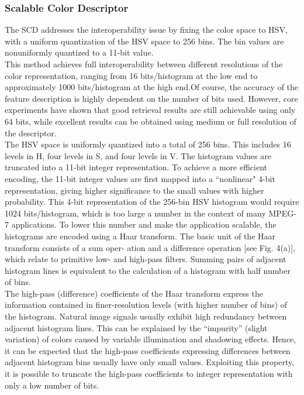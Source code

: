 \subsubsection{Scalable Color Descriptor}
%
The SCD addresses the interoperability issue by fixing the color space to HSV, with a uniform quantization of the HSV space to 256 bins.
The bin values are nonuniformly quantized to a 11-bit value. \\
This method achieves full interoperability between different
resolutions of the color representation, ranging from 16 bits/histogram at the low end to approximately 1000 bits/histogram at
the high end.Of course, the accuracy of the feature description is
highly dependent on the number of bits used. However, core experiments have shown that good retrieval results are still achievable using only 64 bits, while excellent results can be obtained
using medium or full resolution of the descriptor. \\
The HSV space is uniformly quantized into a total of 256
bins. This includes 16 levels in H, four levels in S, and four
levels in V. The histogram values are truncated into a 11-bit
integer representation. To achieve a more efficient encoding, the
11-bit integer values are first mapped into a ``nonlinear" 4-bit representation, giving higher significance to the small values
with higher probability.
This 4-bit representation of the 256-bin HSV histogram
would require 1024 bits/histogram, which is too large a number
in the context of many MPEG-7 applications. To lower this
number and make the application scalable, the histograms are
encoded using a Haar transform.
The basic unit of the Haar transform consists of a sum oper-
ation and a difference operation [see Fig. 4(a)], which relate to
primitive low- and high-pass filters. Summing pairs of adjacent
histogram lines is equivalent to the calculation of a histogram
with half number of bins.\\
The high-pass (difference) coefficients of the Haar transform
express the information contained in finer-resolution levels
(with higher number of bins) of the histogram. Natural image
signals usually exhibit high redundancy between adjacent
histogram lines. This can be explained by the “impurity”
(slight variation) of colors caused by variable illumination and
shadowing effects. Hence, it can be expected that the high-pass
coefficients expressing differences between adjacent histogram
bins usually have only small values. Exploiting this property,
it is possible to truncate the high-pass coefficients to integer
representation with only a low number of bits.\\
